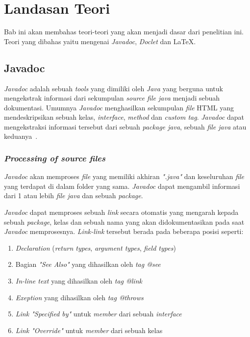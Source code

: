 \lstset{style=mystyle}
\chapter{Landasan Teori}
\label{chap:teori}
Bab ini akan membahas teori-teori yang akan menjadi dasar dari penelitian ini. Teori yang dibahas yaitu mengenai {\it Javadoc}, {\it Doclet} dan \LaTeX .

\section{Javadoc}
\label{sec:javadoc} 
{\it Javadoc} adalah sebuah {\it tools} yang dimiliki oleh {\it Java} yang berguna untuk mengekstrak informasi dari sekumpulan {\it source file java} menjadi sebuah dokumentasi. Umumnya {\it Javadoc} menghasilkan sekumpulan {\it file} HTML yang mendeskripsikan sebuah kelas, {\it interface}, {\it method} dan {\it custom tag}. {\it Javadoc} dapat mengekstraksi informasi tersebut dari sebuah {\it package java}, sebuah {\it file java} atau keduanya~\cite{javadoc:01:javadoc}.

\subsection{\textit{Processing of source files}}
\label{sec:javadoc}
{\it Javadoc} akan memproses {\it file} yang memiliki akhiran {\it ".java"} dan keseluruhan {\it file} yang terdapat di dalam folder yang sama. {\it Javadoc} dapat mengambil informasi dari 1 atau lebih {\it file java} dan sebuah {\it package}.

{\it Javadoc} dapat memproses sebuah {\it link} secara otomatis yang mengarah kepada sebuah {\it package}, kelas dan sebuah nama yang akan didokumentasikan pada saat {\it Javadoc} memprosesnya. {\it Link-link} tersebut berada pada beberapa posisi seperti:
\begin{enumerate}
	\item {\it Declaration} ({\it return types}, {\it argument types}, {\it field types})
	\item Bagian {\it "See Also"} yang dihasilkan oleh {\it tag @see}
	\item {\it In-line text} yang dihasilkan oleh {\it tag {@link}}
	\item {\it Exeption} yang dihasilkan oleh {\it tag @throws}
	\item {\it Link "Specified by"} untuk {\it member} dari sebuah {\it interface}
	\item {\it Link "Override"} untuk {\it member} dari sebuah kelas
\end{enumerate}

